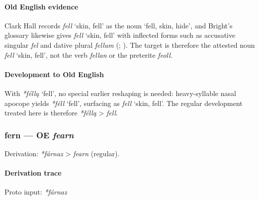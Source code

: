\documentclass[
  british,
  a4paper,
]{article}
\providecommand{\Recon}[1]{\emph{*#1}}
\begin{document}
\paragraph{Old English evidence}\label{old-english-evidence-18}

Clark Hall records {\emph{fell}} `skin, fell' as the noun `fell, skin,
hide', and Bright's glossary likewise gives {\emph{fell}} `skin, fell'
with inflected forms such as accusative singular \emph{fel} and dative
plural \emph{fellum} (;
). The target is
therefore the attested noun {\emph{fell}} `skin, fell', not the verb
\emph{fellan} or the preterite \emph{feoll}.

\paragraph{Development to Old
English}\label{development-to-old-english-18}

With \Recon{féllą} `fell', no special earlier reshaping is needed:
heavy-syllable nasal apocope yields \Recon{féll} `fell', surfacing as
{\emph{fell}} `skin, fell'. The regular development treated here is
therefore \emph{*féllą} \textgreater{} \emph{fell}.

\subsubsection{\texorpdfstring{fern --- OE
\emph{fearn}}{fern --- OE fearn}}\label{fern-oe-fearn}

Derivation: \emph{*fárnaz} \textgreater{} \emph{fearn} (regular).

\paragraph{Derivation trace}\label{derivation-trace-22}

Proto input: \emph{*fárnaz}

\begingroup
\setlength{\fboxsep}{6pt}
\end{document}
